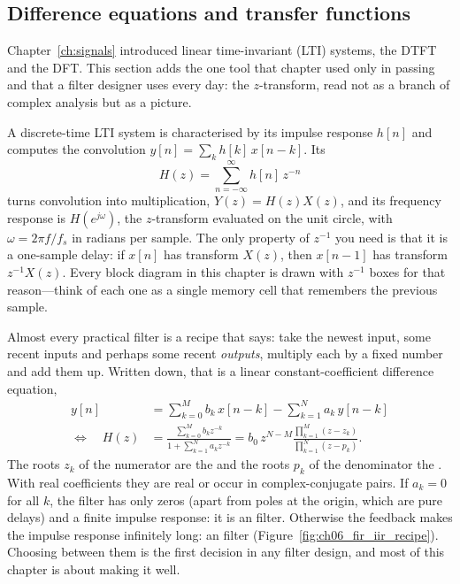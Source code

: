 
\subsection{Difference equations and transfer functions}

Chapter~\ref{ch:signals} introduced linear time-invariant (LTI) systems, the DTFT and the DFT.
This section adds the one tool that chapter used only in passing and that a filter designer
uses every day: the $z$-transform, read not as a branch of complex analysis but as a picture.

A discrete-time LTI system is characterised by its impulse response $h[n]$ and computes the
convolution $y[n]=\sum_k h[k]\,x[n-k]$. Its 
\begin{equation}
H(z)=\sum_{n=-\infty}^{\infty}h[n]\,z^{-n}
\label{eq:ch06:ztrans}
\end{equation}
turns convolution into multiplication, $Y(z)=H(z)X(z)$, and its frequency response is
$H(e^{j\omega})$, the $z$-transform evaluated on the unit circle, with $\omega=2\pi f/f_s$ in
radians per sample. The only property of $z^{-1}$ you need is that it is a one-sample delay: if
$x[n]$ has transform $X(z)$, then $x[n-1]$ has transform $z^{-1}X(z)$. Every block diagram in this
chapter is drawn with $z^{-1}$ boxes for that reason---think of each one as a single memory cell
that remembers the previous sample.

Almost every practical filter is a recipe that says: take the newest input, some recent inputs and
perhaps some recent \emph{outputs}, multiply each by a fixed number and add them up. Written down,
that is a linear constant-coefficient difference equation,
\begin{equation}
\begin{aligned}
y[n]&=\sum_{k=0}^{M}b_k\,x[n-k]-\sum_{k=1}^{N}a_k\,y[n-k]\\
\Longleftrightarrow\quad
H(z)&=\frac{\sum_{k=0}^{M}b_kz^{-k}}{1+\sum_{k=1}^{N}a_kz^{-k}}
=b_0\,z^{N-M}\frac{\prod_{k=1}^{M}(z-z_k)}{\prod_{k=1}^{N}(z-p_k)}.
\end{aligned}
\label{eq:ch06:diffeq}
\end{equation}
The roots $z_k$ of the numerator are the  and the roots $p_k$ of the denominator the
. With real coefficients they are real or occur in complex-conjugate pairs. If
$a_k=0$ for all $k$, the filter has only zeros (apart from poles at the origin, which are pure
delays) and a finite impulse response: it is an  filter. Otherwise the feedback makes
the impulse response infinitely long: an  filter (Figure~\ref{fig:ch06_fir_iir_recipe}).
Choosing between them is the first decision in any filter design, and most of this chapter is about
making it well.

